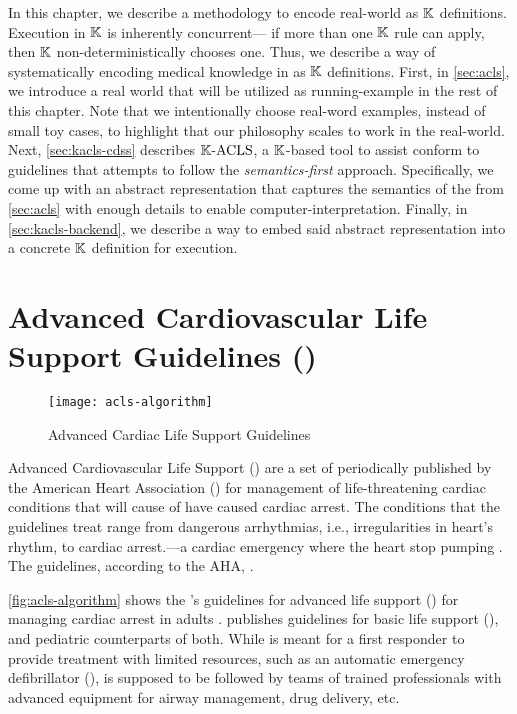 In this chapter, we describe a methodology to encode real-world \BPGs{}
as $\mathbb{K}$ definitions. Execution in $\mathbb{K}{}$ is inherently concurrent---
if more than one $\mathbb{K}{}$ rule can apply, then $\mathbb{K}$ non-deterministically
chooses one. Thus, we describe a way of systematically encoding
medical knowledge in \BPGs{} as $\mathbb{K}$ definitions. First, in
\autoref{sec:acls}, we introduce a real world \BPG{} that will be
utilized as running-example in the rest of this chapter. Note that
we intentionally choose real-word examples, instead of small toy cases,
to highlight that our philosophy scales to work in the real-world.
Next, \autoref{sec:kacls-cdss} describes $\mathbb{K}{}\text{-ACLS}{}$, a $\mathbb{K}$-based tool
to assist \HCPs{} conform to \ACLS{} guidelines that attempts to
follow the \emph{semantics-first} approach. Specifically,
we come up with an abstract representation that captures the semantics
of the \BPG{} from \autoref{sec:acls} with enough details to
enable computer-interpretation. Finally, in \autoref{sec:kacls-backend},
we describe a way to embed said abstract representation into a concrete
$\mathbb{K}$ definition for execution.

\section{Advanced Cardiovascular Life Support Guidelines (\ACLS{})}\label{sec:acls}

\begin{figure}[t!]
  \centering
  \texttt{[image: acls-algorithm]}
  \caption{Advanced Cardiac Life Support Guidelines}\label{fig:acls-algorithm}
\end{figure}

Advanced Cardiovascular Life Support (\ACLS{}) are a set of \BPGs{} periodically
published by the American Heart Association (\AHA{}) for management of
life-threatening cardiac conditions that will cause of have caused cardiac
arrest. The conditions that the guidelines treat range from dangerous arrhythmias, i.e.,
irregularities in heart's rhythm, to cardiac arrest.---a cardiac emergency where
the heart stop pumping \cite{ACLSWikiEntry}.
The guidelines, according to the AHA{},  \cite{ACLSUrl}.

\autoref{fig:acls-algorithm} shows the \AHA{}'s guidelines for advanced
life support (\ALS{}) for managing cardiac arrest in adults \cite{ACLSGuidelineUrl}.
\AHA{} publishes guidelines
for basic life support (\BLS{}), and pediatric counterparts of both. While
\BLS{} is meant for a first responder to provide treatment with
limited resources, such as an automatic emergency defibrillator (\AED{}),
\ACLS{} is supposed to be followed by teams of
trained professionals with advanced equipment for airway management,
drug delivery, etc.

